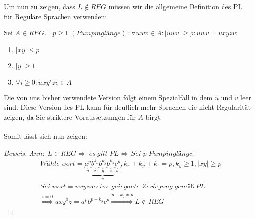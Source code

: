 Um nun zu zeigen, dass $L\notin REG$ müssen wir die allgemeine Definition des PL für Reguläre Sprachen verwenden:

Sei $A\in REG$. $\exists p\ge1\;(Pumpinglänge)\;:\forall uwv\in A:\mid uwv\mid\ge p:uwv=uxyzv:$
\begin{enumerate}
	\item $\mid xy\mid\le p$ \\
	\item $\mid y\mid\ge1$ \\
	\item $\forall i\ge0: uxy^izv\in A$ 
\end{enumerate}
\noindent
Die von uns bisher verwendete Version folgt einem Spezialfall in dem $u$ und $v$ leer sind. Diese Version des PL kann für deutlich mehr Sprachen die nicht-Regularität zeigen, da Sie striktere Voraussetzungen für $A$ birgt.\\\\
Somit lässt sich nun zeigen:

\begin{proof}[Beweis]
	\begin{math}
		Ann:\;L\in REG\Rightarrow\;es\;gilt\;PL\Leftrightarrow\;Sei\;p\;Pumpinglänge:
	\end{math}
	\begin{align*}
		&Wähle\;wort=\underbrace{a^p}_u
		\underbrace{
		\underbrace{b^{k_x}}_x
		\underbrace{b^{k_y}}_y
		\underbrace{b^{k_z}}_z
		}_v
		\underbrace{c^p}_w
		,k_x+k_y+k_z=p,k_y\ge1,\mid xy\mid\ge p\\
		&Sei\;wort=uxyzw\;eine\;geiegnete\;Zerlegung\;gemäß\;PL:\\
		&\overset{i=0}{\Longrightarrow}uxy^0z=a^pb^{p-k_y}c^p\overset{p-k_y\neq p}{\Longrightarrow}L\notin REG
	\end{align*}
\end{proof}
